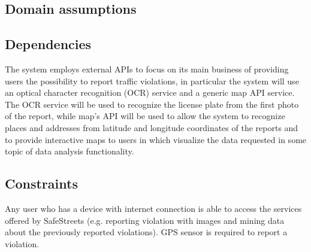 \subsection{Domain assumptions}

\begin{enumerate}[label={D\arabic*.}]
	 \label{D_email}
     \label{D_reports}
     \label{D_mun_availability}
   	 \label{D_mun_accuracy}
     \label{D_auth_validation}
     \label{D_gps}
     \label{D_internet}
     \label{D_city_auth}
     \label{D_pce}
     \label{D_pce_api}
    \label{D_unique_license_plate}
\end{enumerate}


\subsection{Dependencies}

The system employs external APIs to focus on its main business of providing users the possibility to report traffic violations, in particular the system will use an optical character recognition (OCR) service and a generic map API service. The OCR service will be used to recognize the license plate from the first photo of the report, while map's API will be used to allow the system to recognize places and addresses from latitude and longitude coordinates of the reports and to provide interactive maps to users in which visualize the data requested in some topic of data analysis functionality.

\subsection{Constraints}

Any user who has a device with internet connection is able to access the services offered by SafeStreets (e.g. reporting violation with images and mining data about the previously reported violations). GPS sensor is required to report a violation.

